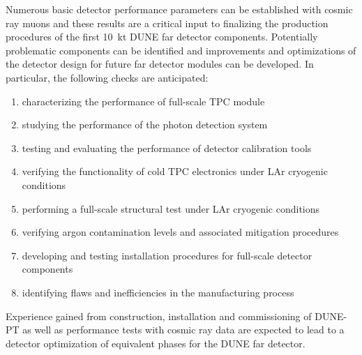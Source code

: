 Numerous basic detector performance parameters can be established with cosmic ray muons and these results are a critical input to finalizing the production procedures of the first 10~kt DUNE far detector components. Potentially problematic components can be identified and improvements and optimizations of the detector design for future far detector modules can be developed. 
%
In particular, the following checks are anticipated:
\begin{enumerate}
 \item characterizing the performance of full-scale TPC module
 \item studying the performance of the photon detection system
 \item testing and evaluating the performance of detector calibration tools
  \item verifying the functionality of cold TPC electronics under LAr cryogenic conditions
  \item performing a full-scale structural test under LAr cryogenic conditions
  \item verifying argon contamination levels and associated mitigation procedures
  \item developing and testing installation procedures for full-scale detector components
  \item identifying flaws and inefficiencies in the manufacturing process
\end{enumerate}

Experience gained from construction, installation and commissioning of DUNE-PT 
as well as performance tests with cosmic ray data are expected to lead to a detector optimization of equivalent phases 
for the DUNE far detector. 

